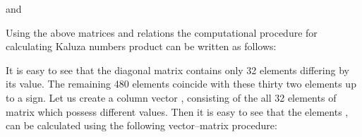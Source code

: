 \documentclass{jtacs}
\numberwithin{equation}{section}
\begin{document}
\begin{center}
\begin{adjustbox}{width=0.57\textwidth, margin=0 0 0 0}

\end{adjustbox}
\end{center}

\begin{center}
\begin{adjustbox}{width=0.57\textwidth, margin=0 0 0 0}

\end{adjustbox}
\end{center}

\begin{center}
\begin{adjustbox}{width=0.57\textwidth, margin=0 0 0 0}

\end{adjustbox}
\end{center}

\begin{center}
\begin{adjustbox}{width=0.57\textwidth, margin=0 0 0 0}

\end{adjustbox}
\end{center}

\begin{center}
\begin{adjustbox}{width=0.57\textwidth, margin=0 10 0 0}

\end{adjustbox}
\end{center}

and

\begin{center}
\begin{adjustbox}{width=0.77\textwidth, margin=0 10 0 10}

\end{adjustbox}
\end{center}

Using the above matrices and relations the computational procedure for calculating Kaluza numbers product can be written as follows:



\begin{adjustbox}{margin = 0 0 0 8}
\end{adjustbox}

It is easy to see that the diagonal matrix  contains only 32 elements differing by its
value. The remaining 480 elements coincide with these thirty two elements up to a sign. Let us create a column vector , consisting of the all 32 elements of matrix  which possess different values. Then it is easy to see that the elements ,  can be calculated using the following vector–matrix procedure:
\end{document}
